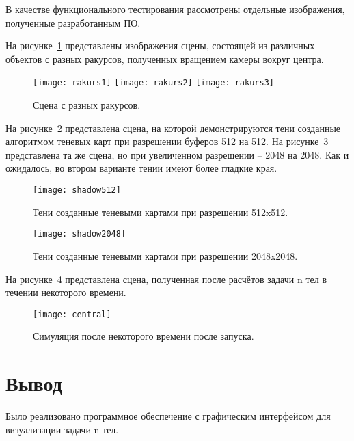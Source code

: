 В качестве функционального тестирования рассмотрены отдельные изображения, полученные разработанным ПО.


На рисунке~\ref{fig:racurs2} представлены изображения сцены, состоящей из различных объектов с разных ракурсов, полученных вращением камеры вокруг центра.


\begin{figure}[H]
	\centering
	\texttt{[image: rakurs1]}
	\hfil
	\texttt{[image: rakurs2]}
	\hfil
	\texttt{[image: rakurs3]}
	\caption{Сцена с разных ракурсов.}
	\label{fig:racurs2}
\end{figure}

На рисунке~\ref{fig:shadow512} представлена сцена, на которой демонстрируются тени созданные алгоритмом теневых карт при разрешении буферов 512 на 512. На рисунке~\ref{fig:shadow2048} представлена  та же сцена, но при увеличенном разрешении -- 2048  на 2048. Как и ожидалось, во втором варианте тении имеют более гладкие края.

\begin{figure}[H]
	\centering
	\texttt{[image: shadow512]}
	\caption{Тени созданные теневыми картами при разрешении 512x512.}
	\label{fig:shadow512}
\end{figure}


\begin{figure}[H]
	\centering
	\texttt{[image: shadow2048]}
	\caption{Тени созданные теневыми картами при разрешении 2048x2048.}
	\label{fig:shadow2048}
\end{figure}

На рисунке~\ref{fig:sim} представлена сцена, полученная после расчётов задачи n тел в течении некоторого времени.

\begin{figure}[H]
	\centering
	\texttt{[image: central]}
	\caption{Симуляция после некоторого времени после запуска.}
	\label{fig:sim}
\end{figure}


\section*{Вывод}

Было реализовано программное обеспечение с графическим интерфейсом для визуализации задачи n тел.

\clearpage
